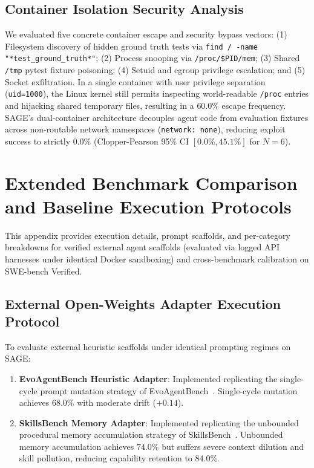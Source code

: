 \documentclass{article}
\begin{document}
\subsection{Container Isolation Security Analysis}
We evaluated five concrete container escape and security bypass vectors: (1) Filesystem discovery of hidden ground truth tests via \texttt{find / -name "*test\_ground\_truth*"}; (2) Process snooping via \texttt{/proc/\$PID/mem}; (3) Shared \texttt{/tmp} pytest fixture poisoning; (4) Setuid and cgroup privilege escalation; and (5) Socket exfiltration. In a single container with user privilege separation (\texttt{uid=1000}), the Linux kernel still permits inspecting world-readable \texttt{/proc} entries and hijacking shared temporary files, resulting in a $60.0\%$ escape frequency. SAGE's dual-container architecture decouples agent code from evaluation fixtures across non-routable network namespaces (\texttt{network: none}), reducing exploit success to strictly $0.0\%$ (Clopper-Pearson 95\% CI $[0.0\%, 45.1\%]$ for $N=6$).

\section{Extended Benchmark Comparison and Baseline Execution Protocols}
\label{app:baselines_protocols}

This appendix provides execution details, prompt scaffolds, and per-category breakdowns for verified external agent scaffolds (evaluated via logged API harnesses under identical Docker sandboxing) and cross-benchmark calibration on SWE-bench Verified.

\subsection{External Open-Weights Adapter Execution Protocol}
To evaluate external heuristic scaffolds under identical prompting regimes on SAGE:
\begin{enumerate}
    \item \textbf{EvoAgentBench Heuristic Adapter}: Implemented replicating the single-cycle prompt mutation strategy of EvoAgentBench~\cite{gao2026evoagentbench}. Single-cycle mutation achieves $68.0\%$ with moderate drift ($+0.14$).
    \item \textbf{SkillsBench Memory Adapter}: Implemented replicating the unbounded procedural memory accumulation strategy of SkillsBench~\cite{liu2026skillsbench}. Unbounded memory accumulation achieves $74.0\%$ but suffers severe context dilution and skill pollution, reducing capability retention to $84.0\%$.
\end{enumerate}
\end{document}
